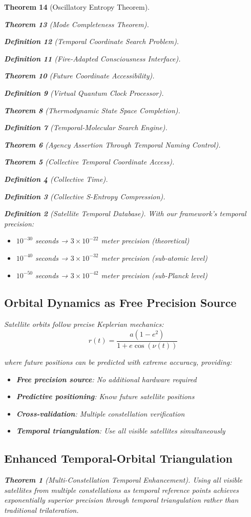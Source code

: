 \documentclass[12pt,a4paper]{article}
\newtheorem{theorem}{Theorem}[section]
\newtheorem{definition}[theorem]{Definition}
\begin{document}
\begin{theorem}[Oscillatory Entropy Theorem]
\begin{theorem}[Mode Completeness Theorem]
\begin{enumerate}
\begin{definition}[Temporal Coordinate Search Problem]
\begin{algorithm}
\begin{definition}[Fire-Adapted Consciousness Interface]
\begin{theorem}[Future Coordinate Accessibility]
\begin{definition}[Virtual Quantum Clock Processor]
\begin{itemize}
\begin{itemize}
\begin{theorem}[Thermodynamic State Space Completion]
\begin{definition}[Temporal-Molecular Search Engine]
\begin{theorem}[Agency Assertion Through Temporal Naming Control]
\begin{remark}
\begin{theorem}[Collective Temporal Coordinate Access]
\begin{definition}[Collective Time]
\begin{definition}[Collective S-Entropy Compression]
\begin{definition}[Satellite Temporal Database]
With our framework's temporal precision:
\begin{itemize}
\item $10^{-30}$ seconds → $3 \times 10^{-22}$ meter precision (theoretical)
\item $10^{-40}$ seconds → $3 \times 10^{-32}$ meter precision (sub-atomic level)
\item $10^{-50}$ seconds → $3 \times 10^{-42}$ meter precision (sub-Planck level)
\end{itemize}

\subsection{Orbital Dynamics as Free Precision Source}

Satellite orbits follow precise Keplerian mechanics:
$$r(t) = \frac{a(1 - e^2)}{1 + e \cos(\nu(t))}$$

where future positions can be predicted with extreme accuracy, providing:
\begin{itemize}
\item \textbf{Free precision source}: No additional hardware required
\item \textbf{Predictive positioning}: Know future satellite positions
\item \textbf{Cross-validation}: Multiple constellation verification
\item \textbf{Temporal triangulation}: Use all visible satellites simultaneously
\end{itemize}

\subsection{Enhanced Temporal-Orbital Triangulation}

\begin{theorem}[Multi-Constellation Temporal Enhancement]
Using all visible satellites from multiple constellations as temporal reference points achieves exponentially superior precision through temporal triangulation rather than traditional trilateration.
\end{theorem}


\end{definition}
\end{definition}
\end{definition}
\end{theorem}
\end{remark}
\end{theorem}
\end{definition}
\end{theorem}
\end{itemize}
\end{itemize}
\end{definition}
\end{theorem}
\end{definition}
\end{algorithm}
\end{definition}
\end{enumerate}
\end{theorem}
\end{theorem}
\end{document}
